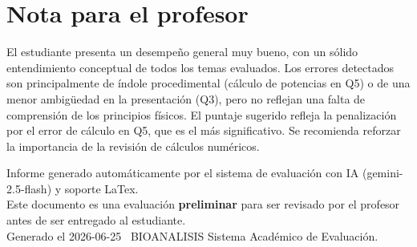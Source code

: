 \documentclass[11pt,a4paper]{article}
\begin{document}
\section*{Nota para el profesor}
\begin{tcolorbox}[
  enhanced, breakable,
  colback=yellow!8, colframe=yellow!60!black,
  fonttitle=\bfseries, coltitle=black,
  title={Observaciones para revisión manual},
  top=4pt, bottom=4pt, left=8pt, right=8pt,
]
El estudiante presenta un desempeño general muy bueno, con un sólido entendimiento conceptual de todos los temas evaluados. Los errores detectados son principalmente de índole procedimental (cálculo de potencias en Q5) o de una menor ambigüedad en la presentación (Q3), pero no reflejan una falta de comprensión de los principios físicos. El puntaje sugerido refleja la penalización por el error de cálculo en Q5, que es el más significativo. Se recomienda reforzar la importancia de la revisión de cálculos numéricos.
\end{tcolorbox}

\vspace{12pt}
\begin{center}
  \footnotesize\color{gray}
  Informe generado automáticamente por el sistema de evaluación con IA (gemini-2.5-flash) y soporte LaTex. \\
  Este documento es una evaluación \textbf{preliminar} para ser revisado por el profesor antes de ser entregado al 
  estudiante. \\
  Generado el 2026-06-25 \textbullet\ BIOANALISIS Sistema Académico de Evaluación.
  \end{center}
\end{document}
